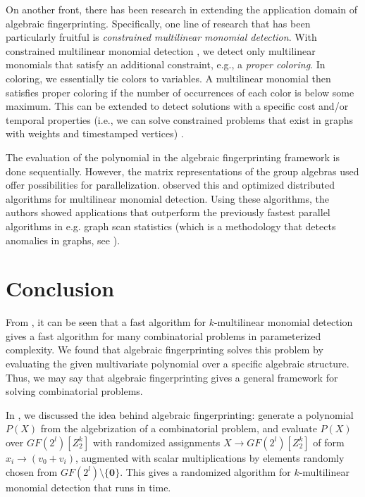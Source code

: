 On another front, there has been research in 
extending the application domain of algebraic fingerprinting. 
Specifically, one line of research that has been particularly fruitful 
is \emph{constrained multilinear monomial detection}. 
With constrained multilinear monomial detection \cite{Koutis12, Björklund16}, 
we detect only multilinear monomials that satisfy an additional constraint, 
e.g., a \emph{proper coloring}. 
In coloring, we essentially tie colors to variables. 
A multilinear monomial then satisfies proper coloring 
if the number of occurrences of each color is below some maximum. 
This can be extended to detect solutions with a specific cost \cite{Björklund16} 
and/or temporal properties 
(i.e., we can solve constrained problems that exist in graphs with weights and timestamped vertices) 
\cite{Thejaswi20}.

The evaluation of the polynomial in the algebraic fingerprinting framework is done sequentially. 
However, the matrix representations of the group algebras used 
offer possibilities for parallelization. \textcite{Midas19} observed this and 
optimized distributed algorithms for multilinear monomial detection. 
Using these algorithms, the authors showed applications that outperform the previously 
fastest parallel algorithms in e.g. graph scan statistics (which 
is a methodology that detects anomalies in graphs, see ).

\section{Conclusion}
\label{sect:conclusion}

From , 
it can be seen  
that a fast algorithm for $k$-multilinear monomial detection gives a 
fast algorithm for many combinatorial problems in parameterized complexity. 
We found that algebraic fingerprinting solves this problem by 
evaluating the given multivariate polynomial over a specific algebraic structure. 
Thus, we 
may say that algebraic fingerprinting gives a general framework for solving 
combinatorial problems. 

In , we discussed the idea behind 
algebraic fingerprinting: generate a polynomial $P(X)$ from the algebrization of 
a combinatorial problem, and evaluate $P(X)$ over $GF(2^{l})[Z_2^k]$ with 
randomized assignments $X \to GF(2^{l})[Z_2^k]$ of form 
$x_i \to (v_0 + v_i)$, augmented with scalar multiplications 
by elements randomly chosen from $GF(2^{l}) \setminus \{\mathbf{0}\}$. 
This gives a randomized algorithm for 
$k$-multilinear monomial detection that runs in  time.

